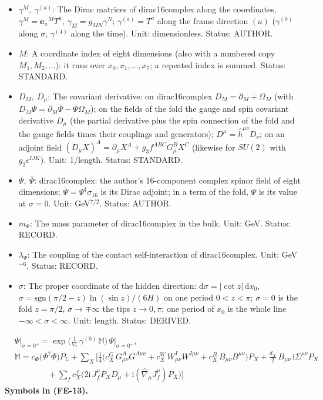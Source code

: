 \documentclass[
  10pt,
]{article}
\providecommand{\tightlist}{%
  \setlength{\itemsep}{0pt}\setlength{\parskip}{0pt}}
\begin{document}
\begin{itemize}
\tightlist
\item
  \(\gamma^M,\ \gamma^{(a)}\): The Dirac matrices of dirac16complex
  along the coordinates, \(\gamma^M = \mathbf{e}_a{}^MT^a\),
  \(\gamma_M = g_{MN}\gamma^N\); \(\gamma^{(a)} = T^a\) along the frame
  direction \((a)\) (\(\gamma^{(0)}\) along \(\sigma\), \(\gamma^{(4)}\)
  along the time). Unit: dimensionless. Status: AUTHOR.
\item
  \(M\): A coordinate index of eight dimensions (also with a numbered
  copy \(M_1, M_2, \dots\)): it runs over \(x_0, x_1, \dots, x_7\); a
  repeated index is summed. Status: STANDARD.
\item
  \(D_M,\ D_\mu\): The covariant derivative: on dirac16complex
  \(D_M = \partial_M + \Omega_M\) (with
  \(D_M\bar\Psi = \partial_M\bar\Psi - \bar\Psi\Omega_M\)); on the
  fields of the fold the gauge and spin covariant derivative \(D_\mu\)
  (the partial derivative plus the spin connection of the fold and the
  gauge fields times their couplings and generators);
  \(D^\mu = \hat h^{\mu\nu}D_\nu\); on an adjoint field
  \((D_\mu X)^A = \partial_\mu X^A + g_3f^{ABC}G^B_\mu X^C\) (likewise
  for \(SU(2)\) with \(g_2\epsilon^{IJK}\)). Unit: 1/length. Status:
  STANDARD.
\item
  \(\Psi,\ \bar\Psi\): dirac16complex: the author's 16-component complex
  spinor field of eight dimensions;
  \(\bar\Psi = \Psi^\dagger\sigma_{16}\) is its Dirac adjoint; in a term
  of the fold, \(\Psi\) is its value at \(\sigma = 0\). Unit:
  GeV\(^{7/2}\). Status: AUTHOR.
\item
  \(m_\Psi\): The mass parameter of dirac16complex in the bulk. Unit:
  GeV. Status: RECORD.
\item
  \(\lambda_\Psi\): The coupling of the contact self-interaction of
  dirac16complex. Unit: GeV\(^{-6}\). Status: RECORD.
\item
  \(\sigma\): The proper coordinate of the hidden direction:
  \(\mathrm{d}\sigma = \lvert\cot z\rvert\,\mathrm{d}x_0\),
  \(\sigma = \mathrm{sgn}(\pi/2 - z)\ln(\sin z)/(6H)\) on one period
  \(0 < z < \pi\); \(\sigma = 0\) is the fold \(z = \pi/2\),
  \(\sigma \to \mp\infty\) the tips \(z \to 0, \pi\); one period of
  \(x_0\) is the whole line \(-\infty < \sigma < \infty\). Unit: length.
  Status: DERIVED.
\end{itemize}

\[
\begin{aligned}
&\Psi\big\vert_{\sigma=0^+} = \exp\Big(\frac{1}{V_*}\,\gamma^{(0)}\,\mathbb{M}\Big)\,\Psi\big\vert_{\sigma=0^-},\\
&\mathbb{M} = c_\Phi\big(\Phi^\dagger\Phi\big)P_{\mathrm{L}} + \sum_X\Big[\frac14\big(c^{G}_X\,G^A_{\mu\nu}G^{A\mu\nu}
 + c^{W}_X\,W^I_{\mu\nu}W^{I\mu\nu} + c^{B}_X\,B_{\mu\nu}B^{\mu\nu}\big)P_X + \frac{d_X}{2}\,B_{\mu\nu}\,\mathrm{i}\Sigma^{\mu\nu}P_X\\
&\qquad\qquad + \sum_f c^{f}_X\big(2\mathrm{i}\,J_f^\mu P_XD_\mu + \mathrm{i}(\hat\nabla_\mu J_f^\mu)P_X\big)\Big]
\end{aligned} \tag{FE-13}
\] \textbf{Symbols in (FE-13).}
\end{document}
